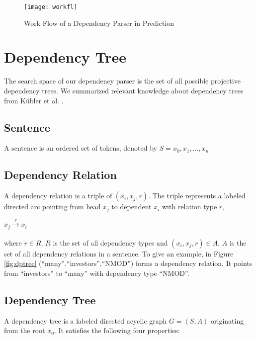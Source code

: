\begin{figure}
  \centering
    \texttt{[image: workfl]}
  \caption{Work Flow of a Dependency Parser in Prediction}
  \label{fig:workfl}
\end{figure}

\section{Dependency Tree}
\label{sec:Dependency Tree}
The search space of our dependency parser is the set of all possible projective dependency trees.
We summarized relevant knowledge about dependency trees from K{\"u}bler et al. \cite{kubler2009dependency}.
\subsection{Sentence}
A sentence is an ordered set of tokens, denoted by 
$S={x_0,x_1,...,x_n}$
\subsection{Dependency Relation}
A dependency relation is a triple of $(x_i,x_j,r)$. The triple represents a labeled directed arc pointing from head $x_j$ to dependent $x_i$ with relation type $r$, 
\begin{center}
$x_j\xrightarrow[]{r} x_i$
\end{center}
where $r\in R$, $R$ is the set of all dependency types and $(x_i,x_j,r)\in A$, $A$ is the set of all dependency relations in a sentence. To give an example, in Figure \ref{fig:dptree} (``many'',``investors'',``NMOD'') forms a dependency relation. It points from ``investors'' to ``many'' with dependency type ``NMOD''.
\subsection{Dependency Tree}
A dependency tree is a labeled directed acyclic graph $G=(S,A)$ originating from the root $x_0$. 
It satisfies the following four properties:

